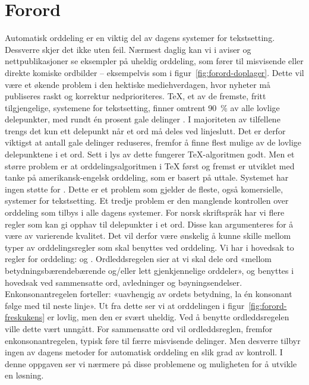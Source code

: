\chapter*{Forord}

Automatisk orddeling er en viktig del av dagens systemer for tekstsetting. Dessverre skjer det ikke uten feil. Nærmest daglig kan vi i aviser og nettpublikasjoner se eksempler på uheldig orddeling, som fører til misvisende eller direkte komiske ordbilder -- eksempelvis som i figur~\ref{fig:forord-doplager}. Dette vil være et økende problem i den hektiske mediehverdagen, hvor nyheter må publiseres raskt og korrektur nedprioriteres. \TeX{}, et av de fremste, fritt tilgjengelige, systemene for tekstsetting, finner omtrent 90~\% av alle lovlige delepunkter, med rundt én prosent gale delinger \cite{thoresen1993virtuelle}. I majoriteten av tilfellene trengs det kun ett delepunkt når et ord må deles ved linjeslutt. Det er derfor viktigst at antall gale delinger reduseres, fremfor å finne flest mulige av de lovlige delepunktene i et ord. Sett i lys av dette fungerer \TeX{}-algoritmen godt. Men et større problem er at orddelingsalgoritmen i \TeX{} først og fremst er utviklet med tanke på amerikansk-engelsk orddeling, som er basert på uttale. Systemet har ingen støtte for . Dette er et problem som gjelder de fleste, også komersielle, systemer for tekstsetting. Et tredje problem er den manglende kontrollen over orddeling som tilbys i alle dagens systemer. For norsk skriftspråk har vi flere regler som kan gi opphav til delepunkter i et ord. Disse kan argumenteres for å være av varierende kvalitet. Det vil derfor være ønskelig å kunne skille mellom typer av orddelingsregler som skal benyttes ved orddeling. Vi har i hovedsak to regler for orddeling:  og . Ordleddsregelen sier at vi skal dele ord «mellom betydningsbærendebærende og/eller lett gjenkjennelige orddeler», og benyttes i hovedsak ved sammensatte ord, avledninger og bøyningsendelser. Enkonsonantregelen forteller: «uavhengig av ordets betydning, la én konsonant følge med til neste linje». \cite{vinje} Ut fra dette ser vi at orddelingen i figur~\ref{fig:forord-freskukens} er lovlig, men den er svært uheldig. Ved å benytte ordleddsregelen ville dette vært unngått. For sammensatte ord vil ordleddsreglen, fremfor enkonsonantregelen, typisk føre til færre misvisende delinger. Men desverre tilbyr ingen av dagens metoder for automatisk orddeling en slik grad av kontroll. I denne oppgaven ser vi nærmere på disse problemene og muligheten for å utvikle en løsning.

